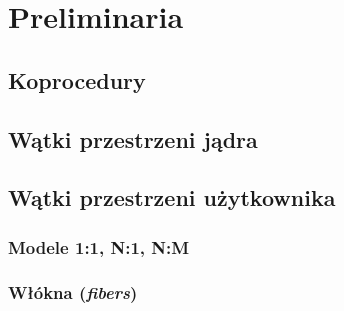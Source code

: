 \section{Preliminaria}

\subsection{Koprocedury}

\subsection{Wątki przestrzeni jądra}

\subsection{Wątki przestrzeni użytkownika}

\subsubsection{Modele 1:1, {\bf N}:1, {\bf N}:{\bf M}}

\subsubsection{Włókna (\emph{fibers})}
